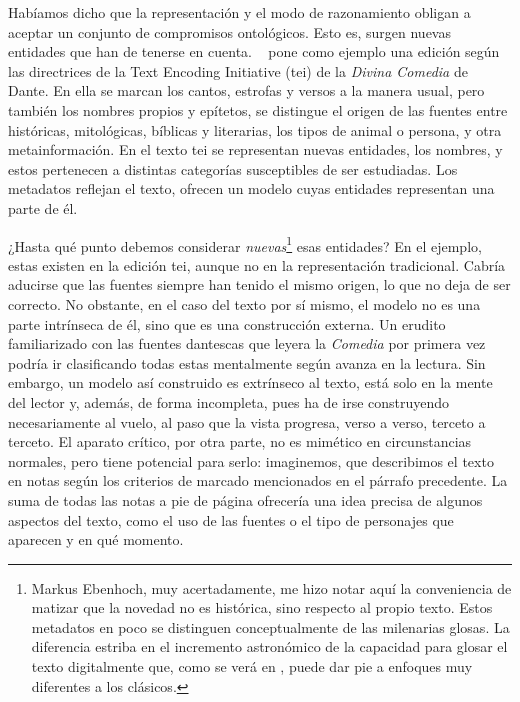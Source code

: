 Habíamos dicho que la representación y el modo de razonamiento obligan a aceptar un conjunto de compromisos ontológicos. Esto es, surgen nuevas entidades que han de tenerse en cuenta. \citeauthor{unsworth2002}~\parencite*{unsworth2002} pone como ejemplo una edición según las directrices de la Text Encoding Initiative (\ac{tei}) de la \textit{Divina Comedia} de Dante. En ella se marcan los cantos, estrofas y versos a la manera usual, pero también los nombres propios y epítetos, se distingue el origen de las fuentes entre históricas, mitológicas, bíblicas y literarias, los tipos de animal o persona, y otra metainformación. En el texto \ac{tei} se representan nuevas entidades, los nombres, y estos pertenecen a distintas categorías susceptibles de ser estudiadas. Los metadatos reflejan el texto, ofrecen un modelo cuyas entidades representan una parte de él.

¿Hasta qué punto debemos considerar \textit{nuevas}\footnote{Markus Ebenhoch, muy acertadamente, me hizo notar aquí la conveniencia de matizar que la novedad no es histórica, sino respecto al propio texto. Estos metadatos en poco se distinguen conceptualmente de las milenarias glosas. La diferencia estriba en el incremento astronómico de la capacidad para glosar el texto digitalmente que, como se verá en , puede dar pie a enfoques muy diferentes a los clásicos.} esas entidades? En el ejemplo, estas existen en la edición \ac{tei}, aunque no en la representación tradicional. Cabría aducirse que las fuentes siempre han tenido el mismo origen, lo que no deja de ser correcto. No obstante, en el caso del texto por sí mismo, el modelo no es una parte intrínseca de él, sino que es una construcción externa. Un erudito familiarizado con las fuentes dantescas que leyera la \textit{Comedia} por primera vez podría ir clasificando todas estas mentalmente según avanza en la lectura. Sin embargo, un modelo así construido es extrínseco al texto, está solo en la mente del lector y, además, de forma incompleta, pues ha de irse construyendo necesariamente al vuelo, al paso que la vista progresa, verso a verso, terceto a terceto. El aparato crítico, por otra parte, no es mimético en circunstancias normales, pero tiene potencial para serlo: imaginemos, que describimos el texto en notas según los criterios de marcado mencionados en el párrafo precedente. La suma de todas las notas a pie de página ofrecería una idea precisa de algunos aspectos del texto, como el uso de las fuentes o el tipo de personajes que aparecen y en qué momento.  

